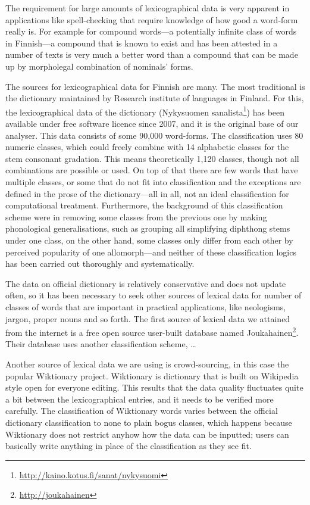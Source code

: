 \documentclass[a4paper,12pt]{article}
\begin{document}
The requirement for large amounts of lexicographical data is very apparent in
applications like spell-checking that require knowledge of how good a word-form
really is. For example for compound words---a potentially infinite class of
words in Finnish---a compound that is known to exist and has been attested in
a number of texts is very much a better word than a compound that can be made
up by morpholegal combination of nominals' forms.

The sources for lexicographical data for Finnish are many. The most traditional
is the dictionary maintained by Research institute of languages in Finland. For
this, the lexicographical data of the dictionary (Nykysuomen
sanalista\footnote{\url{http://kaino.kotus.fi/sanat/nykysuomi}}) has been
available under free software licence since 2007, and it is the original base
of our analyser. This data consists of some 90,000 word-forms. The
classification uses 80 numeric classes, which could freely combine with 14
alphabetic classes for the stem consonant gradation.  This means theoretically
1,120 classes, though not all combinations are possible or used. On top of that
there are few words that have multiple classes, or some that do not fit into
classification and the exceptions are defined in the prose of the
dictionary---all in all, not an ideal classification for computational
treatment. Furthermore, the background of this classification scheme were in
removing some classes from the previous one by making phonological
generalisations, such as grouping all simplifying diphthong stems under one
class, on the other hand, some classes only differ from each other by perceived
popularity of one allomorph---and neither of these classification logics has
been carried out thoroughly and systematically.

The data on official dictionary is relatively conservative and does not update
often, so it has been necessary to seek other sources of lexical data for number
of classes of words that are important in practical applications, like
neologisms, jargon, proper nouns and so forth. The first source of lexical data
we attained from the internet is a free open source user-built database named
Joukahainen\footnote{\url{http://joukahainen}}. Their database uses another
classification scheme, \ldots

Another source of lexical data we are using is crowd-sourcing, in this case the
popular Wiktionary project. Wiktionary is dictionary that is built on Wikipedia
style open for everyone editing. This results that the data quality fluctuates
quite a bit between the lexicographical entries, and it needs to be verified
more carefully. The classification of Wiktionary words varies between the
official dictionary classification to none to plain bogus classes, which happens
because Wiktionary does not restrict anyhow how the data can be inputted; users
can basically write anything in place of the classification as they see fit.
\end{document}
